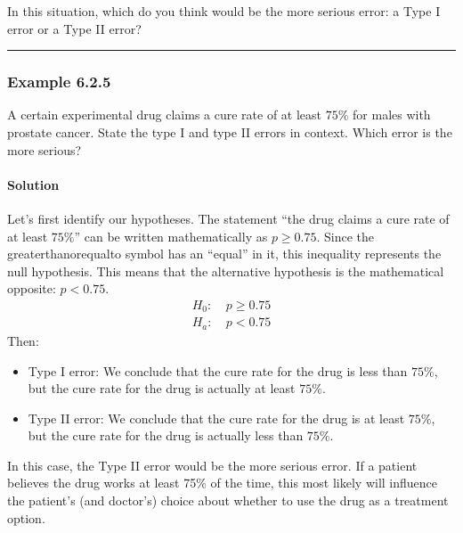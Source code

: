 \documentclass[letterpaper,10pt,english]{jupyterBook}
\begin{document}
\sphinxAtStartPar
In this situation, which do you think would be the more serious error: a Type I error or a Type II error?


\bigskip\hrule\bigskip



\subsubsection{Example 6.2.5}
\label{\detokenize{Ch6 An Introduction to Hypothesis Testing/6.2 Hypotheses and Errors:example-6-2-5}}
\sphinxAtStartPar
A certain experimental drug claims a cure rate of at least \(75\%\) for males with prostate cancer. State the type I and type II errors in context. Which error is the more serious?


\paragraph{Solution}
\label{\detokenize{Ch6 An Introduction to Hypothesis Testing/6.2 Hypotheses and Errors:id4}}
\sphinxAtStartPar
Let’s first identify our hypotheses. The statement “the drug claims a cure rate of at least \(75\%\)” can be written mathematically as \(p \geq 0.75\). Since the greater\sphinxhyphen{}than\sphinxhyphen{}or\sphinxhyphen{}equal\sphinxhyphen{}to symbol has an “equal” in it, this inequality represents the null hypothesis. This means that the alternative hypothesis is the mathematical opposite: \(p < 0.75\).
\begin{align*}
H_0:&\ p \geq 0.75 \\
H_a:&\ p < 0.75
\end{align*}
\sphinxAtStartPar
Then:
\begin{itemize}
\item {} 
\sphinxAtStartPar
Type I error: We conclude that the cure rate for the drug is less than \(75\%\), but the cure rate for the drug is actually at least \(75\%\).

\item {} 
\sphinxAtStartPar
Type II error: We conclude that the cure rate for the drug is at least \(75\%\), but the cure rate for the drug is actually less than \(75\%\).

\end{itemize}

\sphinxAtStartPar
In this case, the Type II error would be the more serious error. If a patient believes the drug works at least 75\% of the time, this most likely will influence the patient’s (and doctor’s) choice about whether to use the drug as a treatment option.
\end{document}
